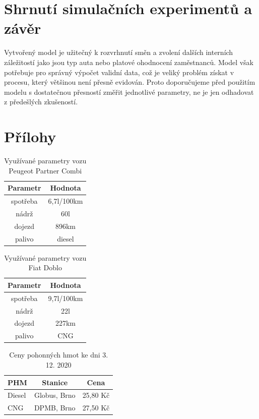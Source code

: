 \documentclass[a4paper, 11pt]{article}
\begin{document}
\newpage
\section{Shrnutí simulačních experimentů a závěr}
Vytvořený model je užitečný k rozvrhnutí směn a zvolení dalších interních záležitostí jako jsou typ auta nebo platové ohodnocení zaměstnanců. Model však potřebuje pro správný výpočet validní data, což je veliký problém získat v procesu, který většinou není přesně evidován. Proto doporučujeme před použitím modelu s dostatečnou přesností změřit jednotlivé parametry, ne je jen odhadovat z předešlých zkušeností. 


\newpage
\section*{Přílohy}
\begin{table}[h]
\centering
\begin{tabular}{cc}
\textbf{Parametr} & \textbf{Hodnota}                                                                                   \\ \hline
spotřeba & 6,7l/100km \\ \hline
nádrž  & 60l \\ \hline                      
dojezd &  896km \\ \hline
palivo & diesel
\end{tabular}
\caption{Využívané parametry vozu Peugeot Partner Combi}
\label{tab:1}
\end{table}

\begin{table}[h]
\centering
\begin{tabular}{cc}
\textbf{Parametr} & \textbf{Hodnota}                                                                                   \\ \hline
spotřeba & 9,7l/100km \\ \hline
nádrž  & 22l \\ \hline
dojezd &  227km \\ \hline
palivo & CNG
\end{tabular}
\caption{Využívané parametry vozu Fiat Doblo}
\label{tab:2}
\end{table}

\begin{table}[h]
\centering
\begin{tabular}{lcc}
\textbf{PHM} & \textbf{Stanice} & \textbf{Cena}                                                                                   \\ \hline
Diesel & Globus, Brno & 25,80 Kč \\ \hline
CNG & DPMB, Brno & 27,50 Kč
\end{tabular}
\caption{Ceny pohonných hmot ke dni 3. 12. 2020}
\label{tab:3}
\end{table}


 

\end{document}
